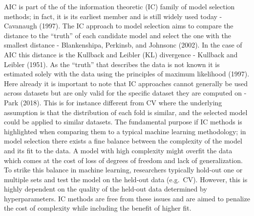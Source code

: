 \documentclass[]{article}
\begin{document}
AIC is part of the of the information theoretic (IC) family of model
selection methods; in fact, it is its earliest member and is still
widely used today - Cavanaugh (1997). The IC approach to model selection
aims to compare the distance to the ``truth'' of each candidate model
and select the one with the smallest distance - Blankenshipa, Perkinsb,
and Johnsonc (2002). In the case of AIC this distance is the Kullback
and Leibler (KL) divergence - Kullback and Leibler (1951). As the
``truth'' that describes the data is not known it is estimated solely
with the data using the principles of maximum likelihood (1997). Here
already it is important to note that IC approaches cannot generally be
used across datasets but are only valid for the specific dataset they
are computed on - Park (2018). This is for instance different from CV
where the underlying assumption is that the distribution of each fold is
similar, and the selected model could be applied to similar datasets.
The fundamental purpose if IC methods is highlighted when comparing them
to a typical machine learning methodology; in model selection there
exists a fine balance between the complexity of the model and its fit to
the data. A model with high complexity might overfit the data which
comes at the cost of loss of degrees of freedom and lack of
generalization. To strike this balance in machine learning, researchers
typically hold-out one or multiple sets and test the model on the
held-out data (e.g.~CV). However, this is highly dependent on the
quality of the held-out data determined by hyperparameters. IC methods
are free from these issues and are aimed to penalize the cost of
complexity while including the benefit of higher fit.
\end{document}
